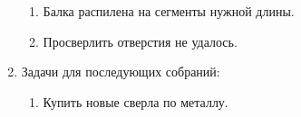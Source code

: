 \begin{enumerate}
\begin{enumerate}
	  \item Балка распилена на сегменты нужной длины.\newline
	  
	  \item Просверлить отверстия не удалось.\newline
	   
    \end{enumerate}
    
	\item Задачи для последующих собраний:\newline
	\begin{enumerate}
	  \item Купить новые сверла по металлу.\newline
	  
    \end{enumerate}     
\end{enumerate}

\fillpage
